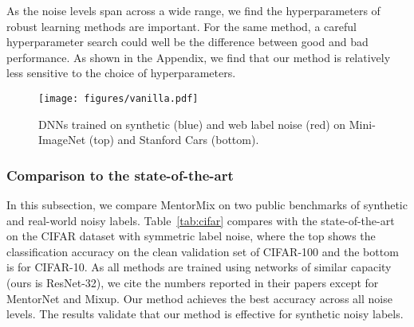 \documentclass{article}
\begin{document}
As the noise levels span across a wide range, we find the hyperparameters of robust
learning methods are important. For the same method, a careful hyperparameter search could well be the difference between good and bad performance. As shown in the Appendix, we find that our method is relatively less sensitive to the choice of hyperparameters.


\begin{figure*}[ht!]
\vspace{-3mm}
\centering
\texttt{[image: figures/vanilla.pdf]}
\vspace{-3mm}
\caption{\label{fig:vanilla}DNNs trained on synthetic (blue) and web label noise (red) on Mini-ImageNet (top) and Stanford Cars (bottom).}
\vspace{-3mm}
\end{figure*}


\subsubsection{Comparison to the state-of-the-art}\label{exp:method_soa}
In this subsection, we compare MentorMix on two public benchmarks of synthetic and real-world noisy labels. Table~\ref{tab:cifar} compares with the state-of-the-art on the CIFAR dataset with symmetric label noise, where the top shows the classification accuracy on the clean validation set of CIFAR-100 and the bottom is for CIFAR-10. As all methods are trained using networks of similar capacity (ours is ResNet-32), we cite the numbers reported in their papers except for MentorNet and Mixup. Our method achieves the best accuracy across all noise levels. The results validate that our method is effective for synthetic noisy labels.
\end{document}
